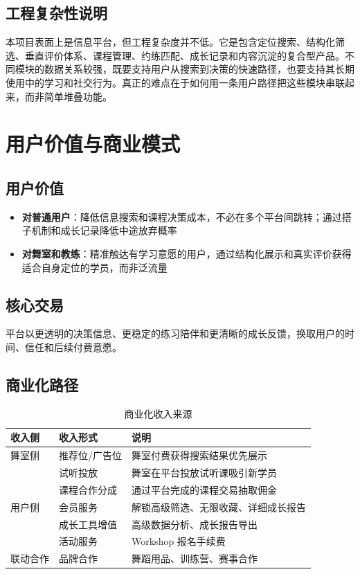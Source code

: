 \documentclass[12pt,a4paper]{ctexart}
\begin{document}
\subsection{工程复杂性说明}

本项目表面上是信息平台，但工程复杂度并不低。它是包含定位搜索、结构化筛选、垂直评价体系、课程管理、约练匹配、成长记录和内容沉淀的复合型产品。不同模块的数据关系较强，既要支持用户从搜索到决策的快速路径，也要支持其长期使用中的学习和社交行为。真正的难点在于如何用一条用户路径把这些模块串联起来，而非简单堆叠功能。

\section{用户价值与商业模式}

\subsection{用户价值}

\begin{itemize}
    \item \textbf{对普通用户}：降低信息搜索和课程决策成本，不必在多个平台间跳转；通过搭子机制和成长记录降低中途放弃概率
    \item \textbf{对舞室和教练}：精准触达有学习意愿的用户，通过结构化展示和真实评价获得适合自身定位的学员，而非泛流量
\end{itemize}

\subsection{核心交易}

平台以更透明的决策信息、更稳定的练习陪伴和更清晰的成长反馈，换取用户的时间、信任和后续付费意愿。

\subsection{商业化路径}

\begin{table}[H]
\centering
\caption{商业化收入来源}
\begin{tabularx}{\textwidth}{L{2cm}L{3.5cm}X}
\toprule
\textbf{收入侧} & \textbf{收入形式} & \textbf{说明} \\
\midrule
舞室侧 & 推荐位/广告位 & 舞室付费获得搜索结果优先展示 \\
 & 试听投放 & 舞室在平台投放试听课吸引新学员 \\
 & 课程合作分成 & 通过平台完成的课程交易抽取佣金 \\
\midrule
用户侧 & 会员服务 & 解锁高级筛选、无限收藏、详细成长报告 \\
 & 成长工具增值 & 高级数据分析、成长报告导出 \\
 & 活动服务 & Workshop 报名手续费 \\
\midrule
联动合作 & 品牌合作 & 舞蹈用品、训练营、赛事合作 \\
\bottomrule
\end{tabularx}
\end{table}
\end{document}
